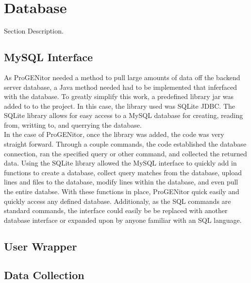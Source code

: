 \section{Database}
\label{sect:database}
Section Description.  

\subsection{MySQL Interface}
As ProGENitor needed a method to pull large amounts of data off the backend
server database, a Java method needed had to be implemented that inferfaced with
the database.  To greatly simplify this work, a predefined library jar was added
to to the project.  In this case, the library used was SQLite JDBC.  The SQLite
library allows for easy access to a MySQL database for creating, reading from,
writting to, and querrying the database.
\\
In the case of ProGENitor, once the library was added, the code was very
straight forward.  Through a couple commands, the code established the database
connection, ran the specified query or other command, and collected the returned
data.\cite{sqlite}  Using the SQLite library allowed the MySQL interface to
quickly add in functions to create a database, collect query matches from the
database, upload lines and files to the database, modify lines within the
database, and even pull the entire databse.  With these functions in place,
ProGENitor quick easily and quickly access any defined database.  Additionaly,
as the SQL commands are standard commands, the interface could easily be
be replaced with another database interface or expanded upon by anyone familiar
with an SQL language.

\subsection{User Wrapper}


\subsection{Data Collection}

